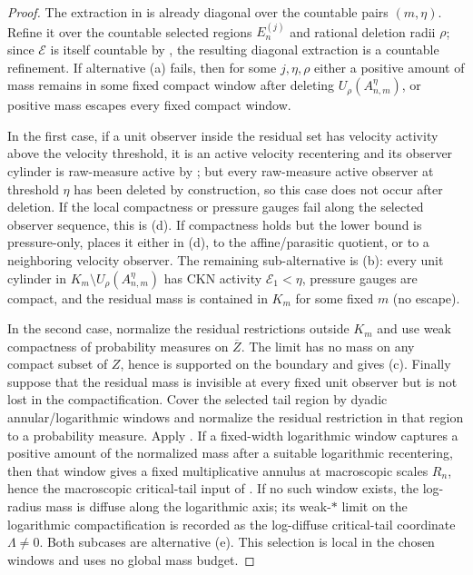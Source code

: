 \documentclass[11pt]{amsart}
\numberwithin{equation}{section}
\theoremstyle{plain}
\theoremstyle{definition}
\theoremstyle{remark}
\newcommand{\calE}{\mathcal E}
\begin{document}
\begin{proof}
The extraction in  is already diagonal over the
countable pairs \((m,\eta)\).  Refine it over the countable selected regions
\(E_n^{(j)}\) and rational deletion radii \(\rho\); since \(\mathcal E\) is
itself countable by , the resulting
diagonal extraction is a countable refinement.  If alternative
\textup{(a)} fails, then for some \(j,\eta,\rho\) either a positive amount of
mass remains in some fixed compact window after deleting
\(U_\rho(A_{n,m}^{\eta})\), or positive mass escapes every fixed compact
window.

In the first case, if a unit observer inside the residual set has velocity
activity above the velocity threshold, it is an active velocity recentering and
its observer cylinder is raw-measure active by
; but every raw-measure active
observer at threshold \(\eta\) has been deleted by construction, so this case
does not occur after deletion.  If the local compactness or pressure gauges
fail along the selected observer sequence, this is \textup{(d)}.  If
compactness holds but the lower bound is pressure-only,
 places it either in \textup{(d)},
to the affine/parasitic quotient, or to a neighboring velocity observer.  The
remaining sub-alternative is \textup{(b)}: every unit cylinder in
\(K_m\setminus U_\rho(A_{n,m}^{\eta})\) has CKN activity \(\calE_1<\eta\),
pressure gauges are compact, and the residual mass is contained in
\(K_m\) for some fixed \(m\) (no escape).

In the second case, normalize the residual restrictions outside \(K_m\) and use
weak compactness of probability measures on \(\overline Z\).  The limit has no
mass on any compact subset of \(Z\), hence is supported on the boundary and gives
\textup{(c)}.  Finally suppose that the residual mass is invisible at every
fixed unit observer but is not lost in the compactification.  Cover the selected
tail region by dyadic annular/logarithmic windows and normalize the residual
restriction in that region to a probability measure.  Apply
.  If a fixed-width logarithmic
window captures a positive amount of the normalized mass after a suitable
logarithmic recentering, then that window gives a fixed multiplicative annulus
at macroscopic scales \(R_n\), hence the macroscopic critical-tail input of
.  If no such window exists, the
log-radius mass is diffuse along the logarithmic axis; its weak-\(*\) limit on
the logarithmic compactification is recorded as the log-diffuse critical-tail
coordinate \(\Lambda\ne0\).  Both subcases are alternative \textup{(e)}.  This
selection is local in the chosen windows and uses no global mass budget.
\end{proof}
\end{document}
